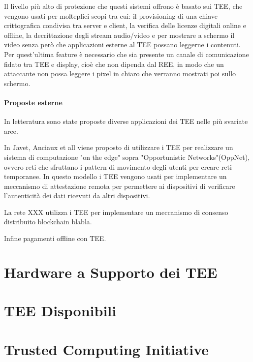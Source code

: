 \documentclass[12pt,italian]{report}
\begin{document}
Il livello più alto di protezione che questi sistemi offrono è basato sui TEE,
che vengono usati per molteplici scopi tra cui: il provisioning di una chiave
crittografica condivisa tra server e client, la verifica delle licenze digitali
online e offline, la decrittazione degli stream audio/video e per mostrare
a schermo il video senza però che applicazioni esterne al TEE possano leggerne
i contenuti.
Per quest'ultima feature è necessario che sia presente un canale di
comunicazione fidato tra TEE e display, cioè che non dipenda dal REE, in modo
che un attaccante non possa leggere i pixel in chiaro che verranno mostrati poi
sullo schermo. 

\paragraph{Proposte esterne}

In letteratura sono state proposte diverse applicazioni dei TEE nelle più svariate aree.

In Javet, Anciaux et all\cite{edgeletcomputing} viene proposto di utilizzare i
TEE per realizzare un sistema di computazione "on the edge" sopra
"Opportunistic Networks"(OppNet), ovvero reti che sfruttano i
pattern di movimento degli utenti per creare reti temporanee.
In questo modello i TEE vengono usati per implementare un meccanismo di
attestazione remota per permettere ai dispositivi di verificare l'autenticità
dei dati ricevuti da altri dispositivi.

La rete XXX\cite{???} utilizza i TEE per implementare un meccanismo di consenso distribuito
blockchain blabla.

Infine \cite{??} pagamenti offline con TEE.

\section{Hardware a Supporto dei TEE}
\label{sec:hardware-supporto-tee}

\section{TEE Disponibili}
\label{sec:tee-disponibili}

\section{Trusted Computing Initiative}
\label{sec:trusted-computing-initiative}
\end{document}
